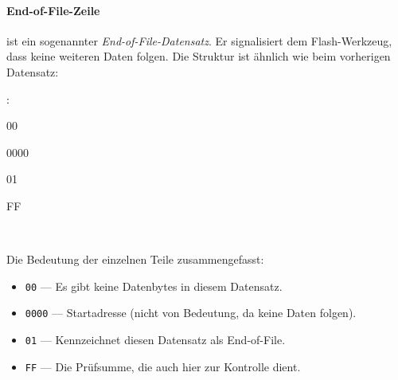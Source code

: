 \documentclass[a4paper,12pt]{article}
\begin{document}
\paragraph{End-of-File-Zeile}
 
ist ein sogenannter \emph{End-of-File-Datensatz}. Er signalisiert dem
Flash-Werkzeug, dass keine weiteren Daten folgen. Die Struktur ist ähnlich
wie beim vorherigen Datensatz:
 
\begin{center}
\begin{minipage}{\textwidth}
\ttfamily
\colorbox{gray!20}{\strut\textcolor{black}{:}}%
\colorbox{myblue!20}{\strut00}%
\colorbox{cyan!20}{\strut0000}%
\colorbox{violet!20}{\strut01}%
\colorbox{red!20}{\strut FF}
\\[0.1cm]

\vspace{0.2cm}

\hspace{1cm}%
\end{minipage}
\end{center}

\noindent
Die Bedeutung der einzelnen Teile zusammengefasst:

\begin{itemize}
  \item \texttt{00} — Es gibt keine Datenbytes in diesem Datensatz.
  \item \texttt{0000} — Startadresse (nicht von Bedeutung, da keine Daten folgen).
  \item \texttt{01} — Kennzeichnet diesen Datensatz als End-of-File.
  \item \texttt{FF} — Die Prüfsumme, die auch hier zur Kontrolle dient.
\end{itemize}
\end{document}
